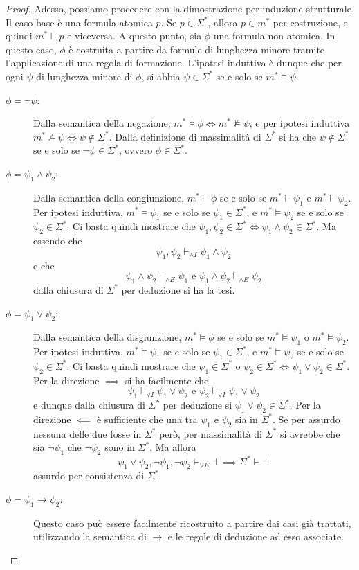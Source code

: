 \begin{proof}
  Adesso, possiamo procedere con la dimostrazione per induzione strutturale.
  Il caso base è una formula atomica \(p\). Se \(p\in\Sigma^*\), allora \(p\in m^*\) per costruzione, e quindi \(m^*\models p\) e viceversa.
  A questo punto, sia \(\phi\) una formula non atomica. In questo caso, \(\phi\) è costruita a partire da formule di lunghezza minore tramite l'applicazione di una regola di formazione. L'ipotesi induttiva è dunque che per ogni \(\psi\) di lunghezza minore di \(\phi\), si abbia \(\psi \in \Sigma^*\) se e solo se \(m^*\models\psi\).
  \begin{description}
    \item[\(\phi = \neg\psi\):] Dalla semantica della negazione, \(m^*\models \phi \iff m^* \not\models \psi\), e per ipotesi induttiva \(m^*\not\models \psi\iff \psi \notin\Sigma^*\). Dalla definizione di massimalità di \(\Sigma^*\) si ha che \(\psi\notin\Sigma^*\) se e solo se \(\neg\psi\in\Sigma^*\), ovvero \(\phi\in\Sigma^*\).
    \item[\(\phi = \psi_1 \land \psi_2\):]
        Dalla semantica della congiunzione, \(m^*\models \phi\) se e solo se \(m^*\models \psi_1\) e \(m^*\models \psi_2\). Per ipotesi induttiva, \(m^*\models \psi_1\) se e solo se \(\psi_1\in\Sigma^*\), e \(m^*\models \psi_2\) se e solo se \(\psi_2\in\Sigma^*\). Ci basta quindi mostrare che \(\psi_1,\psi_2 \in \Sigma^*\iff \psi_1\land\psi_2\in\Sigma^*\).
        Ma essendo che 
        \[\psi_1,\psi_2 \vdash_{\land I} \psi_1\land\psi_2\]
        e che 
        \[\psi_1\land\psi_2\vdash_{\land E} \psi_1 \text{ e } \psi_1\land\psi_2\vdash_{\land E} \psi_2\]
        dalla chiusura di \(\Sigma^*\) per deduzione si ha la tesi.
    \item[\(\phi = \psi_1 \lor \psi_2\):]
        Dalla semantica della disgiunzione, \(m^*\models \phi\) se e solo se \(m^*\models \psi_1\) o \(m^*\models \psi_2\). Per ipotesi induttiva, \(m^*\models \psi_1\) se e solo se \(\psi_1\in\Sigma^*\), e \(m^*\models \psi_2\) se e solo se \(\psi_2\in\Sigma^*\). Ci basta quindi mostrare che \(\psi_1\in\Sigma^*\) o \(\psi_2\in\Sigma^*\iff \psi_1\lor\psi_2\in\Sigma^*\).
        Per la direzione \(\implies\) si ha facilmente che 
        \[\psi_1 \vdash_{\lor I} \psi_1\lor\psi_2 \text{ e } \psi_2 \vdash_{\lor I} \psi_1\lor\psi_2\]
        e dunque dalla chiusura di \(\Sigma^*\) per deduzione si \(\psi_1\lor\psi_2\in\Sigma^*\).
        Per la direzione \(\impliedby\) è sufficiente che una tra \(\psi_1\) e \(\psi_2\) sia in \(\Sigma^*\). Se per assurdo nessuna delle due fosse in \(\Sigma^*\) però, per massimalità di \(\Sigma^*\) si avrebbe che sia \(\neg\psi_1\) che \(\neg\psi_2\) sono in \(\Sigma^*\). Ma allora 
        \[\psi_1\lor\psi_2,\neg\psi_1,\neg\psi_2 \vdash_{\lor E} \bot \implies \Sigma^*\vdash \bot\]
        assurdo per consistenza di \(\Sigma^*\).
      \item[\(\phi = \psi_1 \to \psi_2\):]
        Questo caso può essere facilmente ricostruito a partire dai casi già trattati, utilizzando la semantica di \(\to\) e le regole di deduzione ad esso associate.
  \end{description}
\end{proof}

